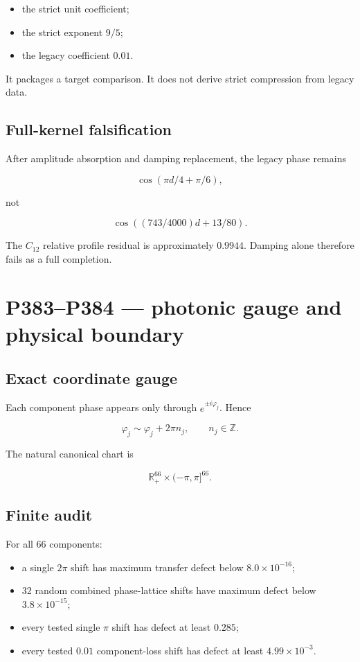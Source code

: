 \documentclass[11pt,a4paper,openany]{report}
\begin{document}
\begin{itemize}
\item 
the strict unit coefficient;

\item 
the strict exponent \(9/5\);

\item 
the legacy coefficient \(0.01\).

\end{itemize}

It packages a target comparison. It does not derive strict compression from legacy data.

\section{Full-kernel falsification}

After amplitude absorption and damping replacement, the legacy phase remains

\[
\cos(\pi d/4+\pi/6),
\]

not

\[
\cos((743/4000)d+13/80).
\]

The \(C_{12}\) relative profile residual is approximately \(0.9944\). Damping alone therefore fails as a full completion.

\chapter{P383--P384 --- photonic gauge and physical boundary}

\section{Exact coordinate gauge}

Each component phase appears only through \(e^{\pm i\varphi_j}\). Hence

\[
\varphi_j\sim\varphi_j+2\pi n_j,
\qquad
n_j\in\mathbb Z.
\]

The natural canonical chart is

\[
\mathbb R_+^{66}\times(-\pi,\pi]^{66}.
\]

\section{Finite audit}

For all 66 components:

\begin{itemize}
\item 
a single \(2\pi\) shift has maximum transfer defect below \(8.0\times10^{-16}\);

\item 
32 random combined phase-lattice shifts have maximum defect below \(3.8\times10^{-15}\);

\item 
every tested single \(\pi\) shift has defect at least \(0.285\);

\item 
every tested \(0.01\) component-loss shift has defect at least \(4.99\times10^{-3}\).

\end{itemize}
\end{document}
